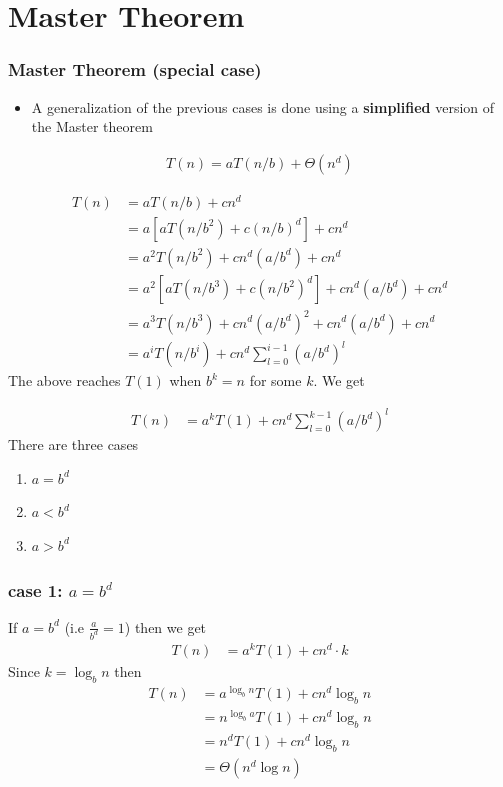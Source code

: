 \documentclass{beamer}
\begin{document}
\section{Master Theorem}
\begin{frame}
  \frametitle{Master Theorem (special case)}
  \begin{itemize}
  \item A generalization of the previous cases is done using a \textbf{simplified} version of the Master theorem
  \end{itemize}
  \begin{align*}
    T(n)=aT(n/b)+\Theta(n^d)
  \end{align*}
\end{frame}
\begin{frame}
  \begin{align*}
    T(n)&=aT(n/b)+cn^d\\
        &=a\left[aT(n/b^2)+c(n/b)^d\right]+cn^d\\
        &=a^2T(n/b^2)+cn^d(a/b^d)+cn^d\\
        &=a^2\left[aT(n/b^3)+c(n/b^2)^d\right]+cn^d(a/b^d)+cn^d\\
        &=a^3T(n/b^3)+cn^d(a/b^d)^2+cn^d(a/b^d)+cn^d\\
        &=a^iT(n/b^i)+cn^d\sum_{l=0}^{i-1}(a/b^d)^l
  \end{align*}
The above reaches $T(1)$ when $b^k=n$ for some $k$. We get
\end{frame}
\begin{frame}
    \begin{align*}
    T(n)&=a^kT(1)+cn^d\sum_{l=0}^{k-1}(a/b^d)^l
  \end{align*}
There are three cases
\begin{enumerate}
\item $a=b^d$
\item $a< b^d$
\item $a> b^d$
\end{enumerate}
\end{frame}
\begin{frame}
\frametitle{case 1: $a=b^d$}
 If $a=b^d$ (i.e $\frac{a}{b^d}=1$) then we get
 \begin{align*}
    T(n)&=a^kT(1)+cn^d\cdot k
  \end{align*}
Since $k=\log_b n$ then
 \begin{align*}
    T(n)&=a^{\log_bn}T(1)+cn^d\log_b n\\
        &=n^{\log_b a}T(1)+cn^d\log_bn\\
        &=n^dT(1)+cn^d\log_b n\\
        &=\Theta(n^d\log n)
  \end{align*}
\end{frame}
\end{document}
